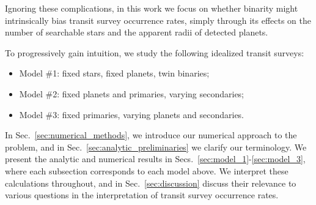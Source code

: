 Ignoring these complications, in this work we focus on whether
binarity might intrinsically bias transit survey occurrence rates, simply 
through its effects on the number of searchable stars and the apparent radii 
of detected planets.

To progressively gain intuition, we study the following idealized transit 
surveys:
\begin{itemize}
    \item Model \#1: fixed stars, fixed planets, twin binaries;
    \item Model \#2: fixed planets and primaries, varying secondaries;
    \item Model \#3: fixed primaries, varying planets and secondaries.
\end{itemize}
In Sec.~\ref{sec:numerical_methods}, we introduce our numerical approach 
to the problem, and in Sec.~\ref{sec:analytic_preliminaries} we clarify our 
terminology.
We present the analytic and numerical results in 
Secs.~\ref{sec:model_1}-\ref{sec:model_3}, where each subsection corresponds 
to each model above.
We interpret these calculations throughout, and in 
Sec.~\ref{sec:discussion} discuss their relevance to various questions in 
the interpretation of transit survey occurrence rates. 
